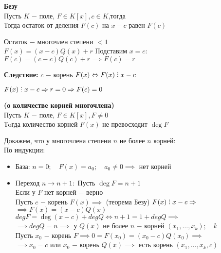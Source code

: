 \begin{theorem}
	\textbf{Безу}\\
	Пусть $K$ $-$ поле, $F \in K[x], c \in K$,тогда \\
	Тогда остаток от деления $F(c)$ на $x-c$ равен  $F(c)$
\end{theorem}
\begin{replacementproof}
	Остаток $-$ многочлен степени $<1$\\
	 $F(x)=(x-c)Q(x)+r$ Подставим $x=c:$ \\
	 $F(c)=(c-c)Q(c)+r \implies F(c)=r$
\end{replacementproof}
\textbf{Следствие:} $c$ $-$ корень $F(x) \iff F(x) \divby x-c$
\begin{replacementproof}
	$F(x) \divby x-c \implies r=0 \implies F(c)=0$
\end{replacementproof}
\begin{theorem}
	\textbf{(о количестве корней многочлена)}\\
	Пусть $K$ $-$ поле, $F \in K[x], F\neq 0$ \\
	Тoгда количество корней $F(x)$ не превосходит $\deg F$
\end{theorem}
\begin{replacementproof}
	Докажем, что у многочлена степени $n$ не более $n$ корней:\\
  
  По индукции:
  \begin{itemize} 
    \item База: $n=0; \quad F(x)=a_0; \quad a_0\neq 0 \implies$ нет корней
    
    \item Переход $n \to n+1:$ Пусть $\deg F=n+1$\\
    Если у $F$ нет корней $-$ верно\\
    Пусть $c$ $-$ корень $F(x) \implies$ (теорема Безу) $F(x) \divby x-c \implies$ \\
    $\implies F(x)=(x-c)Q(x)$ \\
    $degF=\deg (x-c)+degQ \iff n+1 = 1 + degQ \implies$\\
    $\implies degQ=n \implies$ у $Q(x)$ не более $n$ $-$ корней $(x_1,\ldots,x_k); \quad k$\\
    Пусть $x_0$ $-$ корень $F \implies 0=F(x_0)=(x_0-c)Q(x_0) \implies$\\
    $\implies x_0=c$ или $x_0$ $-$ корень $Q(x) \implies$ есть корень $(x_1,\ldots,x_k,c)$ 
  \end{itemize}
\end{replacementproof}
